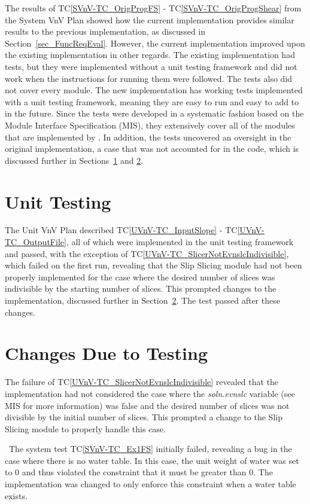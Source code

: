 \documentclass[12pt, titlepage]{article}
\newcommand{\tcref}[1]{TC\ref{#1}}
\begin{document}
The results of \tcref{SVnV-TC_OrigProgFS} - \tcref{SVnV-TC_OrigProgShear} from 
the System VnV Plan showed how the current implementation provides similar 
results to the previous implementation, as discussed in 
Section~\ref{sec_FuncReqEval}. However, the current implementation improved 
upon the existing implementation in other regards. The existing implementation 
had tests, but they were implemented without a unit testing framework and did 
not work when the instructions for running them were followed. The tests also 
did not cover every module. The new implementation has working tests 
implemented with a unit testing framework, meaning they are easy to run and 
easy to add to in the future. Since the tests were developed in a systematic 
fashion based on the Module Interface Specification (MIS), they extensively 
cover all of the modules that are implemented by \progname{}. In addition, the 
tests uncovered an oversight in the original implementation, a case that was 
not accounted for in the code, which is discussed further in 
Sections~\ref{sec_UnitTests} and \ref{sec_Changes}.

\section{Unit Testing}  \label{sec_UnitTests}
The Unit VnV Plan described \tcref{UVnV-TC_InputSlope} - 
\tcref{UVnV-TC_OutputFile}, all of which were implemented in the unit testing 
framework and passed, with the exception of 
\tcref{UVnV-TC_SlicerNotEvnslcIndivisible}, which failed on the first run, 
revealing that the Slip Slicing module had not been properly implemented for 
the case where the desired number of slices was indivisible by the starting 
number of slices. This prompted changes to the implementation, discussed 
further in Section~\ref{sec_Changes}. The test passed after these changes.

\section{Changes Due to Testing} \label{sec_Changes}
The failure of \tcref{UVnV-TC_SlicerNotEvnslcIndivisible} revealed that the 
implementation had not considered the case where the \textit{soln.evnslc} 
variable (see MIS for more information) was false and the desired number of 
slices was not divisible by the initial number of slices. This prompted a 
change to the Slip Slicing module to properly handle this case. 

~\newline \noindent The system test \tcref{SVnV-TC_Ex1FS} initially failed, 
revealing a bug in the case where there is no water table. In this case, the 
unit weight of water was set to 0 and thus violated the constraint that it must 
be greater than 0. The implementation was changed to only enforce this 
constraint when a water table exists.
\end{document}
